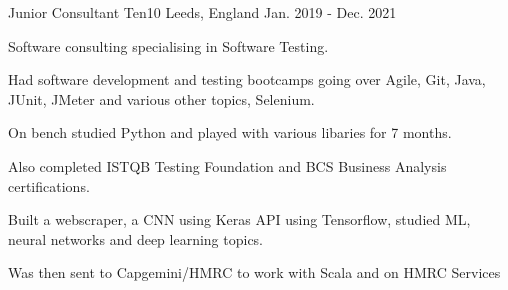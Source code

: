 \begin{cventries}
{    }
    \cventry
    {Junior Consultant} 
    {Ten10} 
    {Leeds, England} 
    {Jan. 2019 - Dec. 2021}
    {
      \raggedright
      \begin{cvitems}
        \item {Software consulting specialising in Software Testing.}
        \item {Had software development and testing bootcamps going over Agile, Git, Java, JUnit, JMeter and various other topics, Selenium.}
        \item {On bench studied Python and played with various libaries for 7 months.}
        \item {Also completed ISTQB Testing Foundation and BCS Business Analysis certifications.}
        \item {Built a webscraper, a CNN using Keras API using Tensorflow, studied ML, neural networks and deep learning topics.}
        \item {Was then sent to Capgemini/HMRC to work with Scala and on HMRC Services}
      \end{cvitems}
    }    

\end{cventries}
